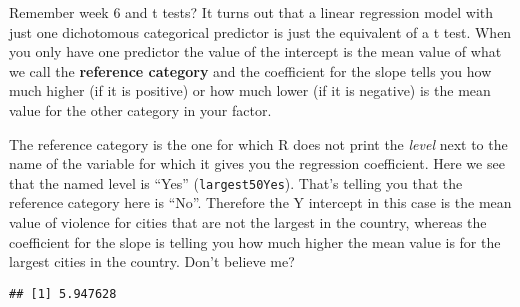 \documentclass[
]{book}
\newenvironment{Shaded}{\begin{snugshade}}{\end{snugshade}}
\newcommand{\AttributeTok}[1]{\textcolor[rgb]{0.13,0.29,0.53}{#1}}
\newcommand{\CommentTok}[1]{\textcolor[rgb]{0.56,0.35,0.01}{\textit{#1}}}
\newcommand{\ConstantTok}[1]{\textcolor[rgb]{0.56,0.35,0.01}{#1}}
\newcommand{\FunctionTok}[1]{\textcolor[rgb]{0.13,0.29,0.53}{\textbf{#1}}}
\newcommand{\NormalTok}[1]{#1}
\newcommand{\SpecialCharTok}[1]{\textcolor[rgb]{0.81,0.36,0.00}{\textbf{#1}}}
\newcommand{\StringTok}[1]{\textcolor[rgb]{0.31,0.60,0.02}{#1}}
\begin{document}
Remember week 6 and t tests? It turns out that a linear regression model with just one dichotomous categorical predictor is just the equivalent of a t test. When you only have one predictor the value of the intercept is the mean value of what we call the \textbf{reference category} and the coefficient for the slope tells you how much higher (if it is positive) or how much lower (if it is negative) is the mean value for the other category in your factor.

The reference category is the one for which R does not print the \emph{level} next to the name of the variable for which it gives you the regression coefficient. Here we see that the named level is ``Yes'' (\texttt{largest50Yes}). That's telling you that the reference category here is ``No''. Therefore the Y intercept in this case is the mean value of violence for cities that are not the largest in the country, whereas the coefficient for the slope is telling you how much higher the mean value is for the largest cities in the country. Don't believe me?

\begin{Shaded}
\end{Shaded}

\begin{verbatim}
## [1] 5.947628
\end{verbatim}

\begin{Shaded}
\end{Shaded}
\end{document}
